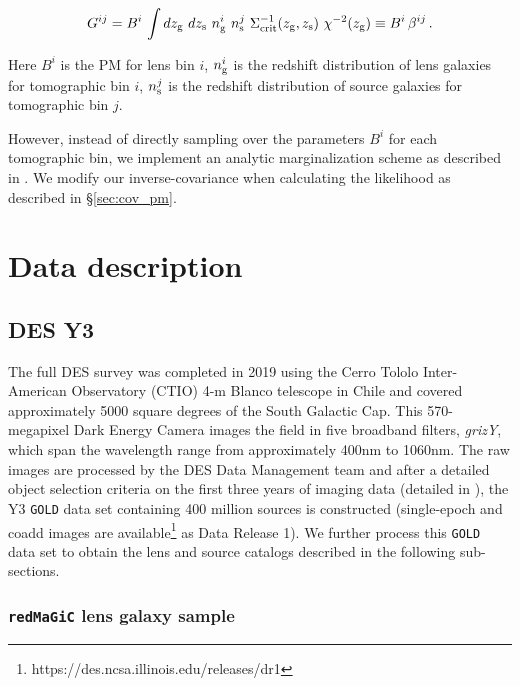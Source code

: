 \documentclass[aps, prd,twocolumn,superscriptaddress,nofootinbib,preprintnumbers]{revtex4-1}
\newcommand{\redmagic}{\texttt{redMaGiC} }
\newcommand{\gold}{\texttt{GOLD} }
\begin{document}
\begin{linenomath*}
\begin{equation}\label{eq:pm_Cij}
    G^{ij} = B^i \, \int dz_{\rm g} \ dz_{\rm s} \ n^{i}_{{\rm g}} \ n^{j}_{{\rm s}} \ \Sigma^{-1}_{\rm crit}(z_{\rm g},z_{\rm s}) \ \chi^{-2}(z_{\rm g}) \equiv B^i \, \beta^{ij} \,.
\end{equation}
\end{linenomath*}
Here $B^i$ is the PM for lens bin $i$, $n^{i}_{{\rm g}}$ is the redshift distribution of lens galaxies for tomographic bin $i$, $n^{j}_{{\rm s}}$ is the redshift distribution of source galaxies for tomographic bin $j$. 

However, instead of directly sampling over the parameters $B^i$ for each tomographic bin, we implement an analytic marginalization scheme as described in \cite{MacCrann:2019ntb}. We modify our inverse-covariance when calculating the likelihood as described in \S\ref{sec:cov_pm}.

    

\section{Data description}
\label{sec:data}
\subsection{DES Y3}

The full DES survey was completed in 2019 using the Cerro Tololo Inter-American Observatory (CTIO) 4-m Blanco telescope in Chile and covered approximately 5000 square degrees of the South Galactic Cap. This 570-megapixel Dark Energy Camera \citep{Flaugher15} images the field in five broadband filters, \textit{grizY}, which span the wavelength range from approximately 400nm to 1060nm. The raw images are processed by the DES Data Management team \citep{Sevilla11, Morganson18} and after a detailed object selection criteria on the first three years of imaging data (detailed in \citet*{Abbott_2018}), the Y3 \gold data set containing 400 million sources is constructed (single-epoch and coadd images are available\footnote{https://des.ncsa.illinois.edu/releases/dr1} as Data Release 1). We further process this \gold data set to obtain the lens and source catalogs described in the following sub-sections.


\subsubsection{\redmagic lens galaxy sample}
\end{document}
